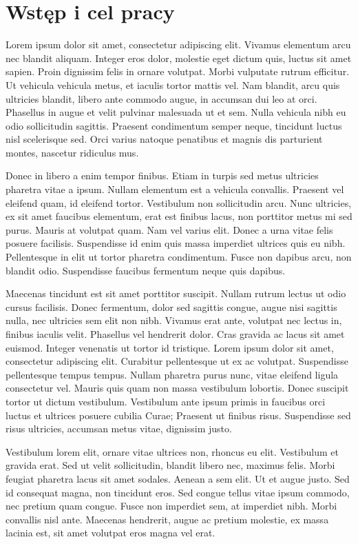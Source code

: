 \chapter{Wstęp i cel pracy} 
Lorem ipsum dolor sit amet, consectetur adipiscing elit. Vivamus elementum arcu nec blandit aliquam. Integer eros dolor, molestie eget dictum quis, luctus sit amet sapien. Proin dignissim felis in ornare volutpat. Morbi vulputate rutrum efficitur. Ut vehicula vehicula metus, et iaculis tortor mattis vel. Nam blandit, arcu quis ultricies blandit, libero ante commodo augue, in accumsan dui leo at orci. Phasellus in augue et velit pulvinar malesuada ut et sem. Nulla vehicula nibh eu odio sollicitudin sagittis. Praesent condimentum semper neque, tincidunt luctus nisl scelerisque sed. Orci varius natoque penatibus et magnis dis parturient montes, nascetur ridiculus mus.

Donec in libero a enim tempor finibus. Etiam in turpis sed metus ultricies pharetra vitae a ipsum. Nullam elementum est a vehicula convallis. Praesent vel eleifend quam, id eleifend tortor. Vestibulum non sollicitudin arcu. Nunc ultricies, ex sit amet faucibus elementum, erat est finibus lacus, non porttitor metus mi sed purus. Mauris at volutpat quam. Nam vel varius elit. Donec a urna vitae felis posuere facilisis. Suspendisse id enim quis massa imperdiet ultrices quis eu nibh. Pellentesque in elit ut tortor pharetra condimentum. Fusce non dapibus arcu, non blandit odio. Suspendisse faucibus fermentum neque quis dapibus.

Maecenas tincidunt est sit amet porttitor suscipit. Nullam rutrum lectus ut odio cursus facilisis. Donec fermentum, dolor sed sagittis congue, augue nisi sagittis nulla, nec ultricies sem elit non nibh. Vivamus erat ante, volutpat nec lectus in, finibus iaculis velit. Phasellus vel hendrerit dolor. Cras gravida ac lacus sit amet euismod. Integer venenatis ut tortor id tristique. Lorem ipsum dolor sit amet, consectetur adipiscing elit. Curabitur pellentesque ut ex ac volutpat. Suspendisse pellentesque tempus tempus. Nullam pharetra purus nunc, vitae eleifend ligula consectetur vel. Mauris quis quam non massa vestibulum lobortis. Donec suscipit tortor ut dictum vestibulum. Vestibulum ante ipsum primis in faucibus orci luctus et ultrices posuere cubilia Curae; Praesent ut finibus risus. Suspendisse sed risus ultricies, accumsan metus vitae, dignissim justo.

Vestibulum lorem elit, ornare vitae ultrices non, rhoncus eu elit. Vestibulum et gravida erat. Sed ut velit sollicitudin, blandit libero nec, maximus felis. Morbi feugiat pharetra lacus sit amet sodales. Aenean a sem elit. Ut et augue justo. Sed id consequat magna, non tincidunt eros. Sed congue tellus vitae ipsum commodo, nec pretium quam congue. Fusce non imperdiet sem, at imperdiet nibh. Morbi convallis nisl ante. Maecenas hendrerit, augue ac pretium molestie, ex massa lacinia est, sit amet volutpat eros magna vel erat.

